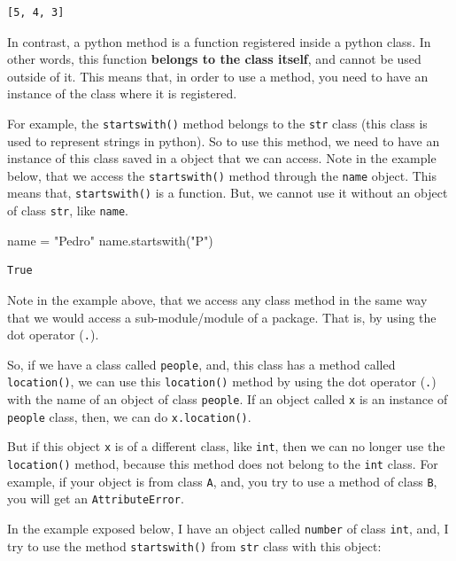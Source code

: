 \documentclass[
  11pt,
  letterpaper,
  DIV=11,
  numbers=noendperiod]{scrreprt}
\newenvironment{Shaded}{\begin{snugshade}}{\end{snugshade}}
\newcommand{\NormalTok}[1]{\textcolor[rgb]{0.00,0.23,0.31}{#1}}
\newcommand{\OperatorTok}[1]{\textcolor[rgb]{0.37,0.37,0.37}{#1}}
\newcommand{\StringTok}[1]{\textcolor[rgb]{0.13,0.47,0.30}{#1}}
\begin{document}
\begin{verbatim}
[5, 4, 3]
\end{verbatim}

In contrast, a python method is a function registered inside a python
class. In other words, this function \textbf{belongs to the class
itself}, and cannot be used outside of it. This means that, in order to
use a method, you need to have an instance of the class where it is
registered.

For example, the \texttt{startswith()} method belongs to the
\texttt{str} class (this class is used to represent strings in python).
So to use this method, we need to have an instance of this class saved
in a object that we can access. Note in the example below, that we
access the \texttt{startswith()} method through the \texttt{name}
object. This means that, \texttt{startswith()} is a function. But, we
cannot use it without an object of class \texttt{str}, like
\texttt{name}.

\begin{Shaded}
\begin{Highlighting}[]
\NormalTok{name }\OperatorTok{=} \StringTok{"Pedro"}
\NormalTok{name.startswith(}\StringTok{"P"}\NormalTok{)}
\end{Highlighting}
\end{Shaded}

\begin{verbatim}
True
\end{verbatim}

Note in the example above, that we access any class method in the same
way that we would access a sub-module/module of a package. That is, by
using the dot operator (\texttt{.}).

So, if we have a class called \texttt{people}, and, this class has a
method called \texttt{location()}, we can use this \texttt{location()}
method by using the dot operator (\texttt{.}) with the name of an object
of class \texttt{people}. If an object called \texttt{x} is an instance
of \texttt{people} class, then, we can do \texttt{x.location()}.

But if this object \texttt{x} is of a different class, like
\texttt{int}, then we can no longer use the \texttt{location()} method,
because this method does not belong to the \texttt{int} class. For
example, if your object is from class \texttt{A}, and, you try to use a
method of class \texttt{B}, you will get an \texttt{AttributeError}.

In the example exposed below, I have an object called \texttt{number} of
class \texttt{int}, and, I try to use the method \texttt{startswith()}
from \texttt{str} class with this object:
\end{document}
